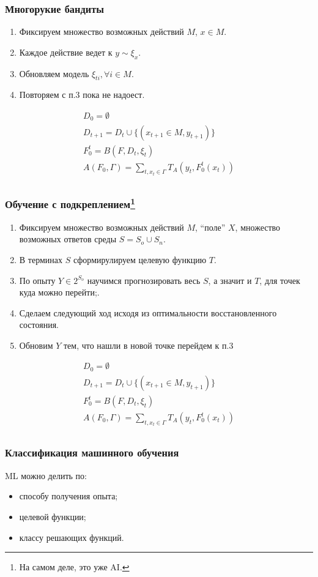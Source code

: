 \documentclass[14pt, fleqn, xcolor={dvipsnames, table}]{beamer}
\begin{document}
\begin{frame}
\frametitle{Многорукие бандиты}
\begin{enumerate}
	\item Фиксируем множество возможных действий $M$, $x\in M$.
	\item Каждое действие ведет к $y \sim \xi_x$.
	\item Обновляем модель $\xi_{ti}, \forall i \in M$.
	\item Повторяем с п.3 пока не надоест.
\end{enumerate}
$$\begin{array}{l}
D_0 = \emptyset \\
D_{t+1} = D_{t} \cup \{(x_{t+1} \in M, y_{t+1})\} \\
F_0^t = B(F, D_{t}, \xi_t) \\
A(F_0, \Gamma) = \sum_{t, x_t \in \Gamma} T_A(y_t, F_0^t(x_t)) \\
\end{array}$$
\end{frame}

\begin{frame}
\frametitle{Обучение с подкреплением\footnote{На самом деле, это уже AI.}}
\small
\begin{enumerate}
	\item Фиксируем множество возможных действий $M$, ``поле'' $X$, множество возможных ответов среды $S = S_o \cup S_n$.
	\item В терминах $S$ сформирулируем целевую функцию $T$.
	\item По опыту $Y \in 2^{S_o}$ научимся прогнозировать весь $S$, а значит и $T$, для точек куда можно перейти;.
	\item Сделаем следующий ход исходя из оптимальности восстановленного состояния.
	\item Обновим $Y$ тем, что нашли в новой точке перейдем к п.3
\end{enumerate}
$$\begin{array}{l}
D_0 = \emptyset \\
D_{t+1} = D_{t} \cup \{(x_{t+1} \in M, y_{t+1})\} \\
F_0^t = B(F, D_{t}, \xi_t) \\
A(F_0, \Gamma) = \sum_{t, x_t \in \Gamma} T_A(y_t, F_0^t(x_t)) \\
\end{array}$$
\end{frame}

\begin{frame}
\frametitle{Классификация машинного обучения}
ML можно делить по:
\begin{itemize}
	\item способу получения опыта;
	\item { целевой функции;}
	\item классу решающих функций.
\end{itemize}
\end{frame}
\end{document}

